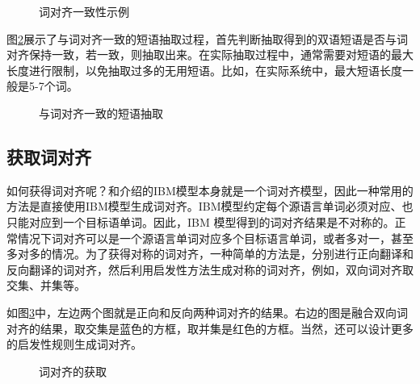 \begin{figure}[htp]
\centering

\caption{词对齐一致性示例}
\label{fig:7-14}
\end{figure}

\parinterval 图\ref{fig:7-15}展示了与词对齐一致的短语抽取过程，首先判断抽取得到的双语短语是否与词对齐保持一致，若一致，则抽取出来。在实际抽取过程中，通常需要对短语的最大长度进行限制，以免抽取过多的无用短语。比如，在实际系统中，最大短语长度一般是5-7个词。

\begin{figure}[htp]
\centering

\caption{与词对齐一致的短语抽取}
\label{fig:7-15}
\end{figure}


\subsection{获取词对齐}

\parinterval 如何获得词对齐呢？{\chapterfive}和{\chaptersix}介绍的IBM模型本身就是一个词对齐模型，因此一种常用的方法是直接使用IBM模型生成词对齐。IBM模型约定每个源语言单词必须对应、也只能对应到一个目标语单词。因此，IBM 模型得到的词对齐结果是不对称的。正常情况下词对齐可以是一个源语言单词对应多个目标语言单词，或者多对一，甚至多对多的情况。为了获得对称的词对齐，一种简单的方法是，分别进行正向翻译和反向翻译的词对齐，然后利用启发性方法生成对称的词对齐，例如，双向词对齐取交集、并集等。

\parinterval 如图\ref{fig:7-16}中，左边两个图就是正向和反向两种词对齐的结果。右边的图是融合双向词对齐的结果，取交集是蓝色的方框，取并集是红色的方框。当然，还可以设计更多的启发性规则生成词对齐。

\begin{figure}[htp]
\centering

\caption{词对齐的获取}
\label{fig:7-16}
\end{figure}

